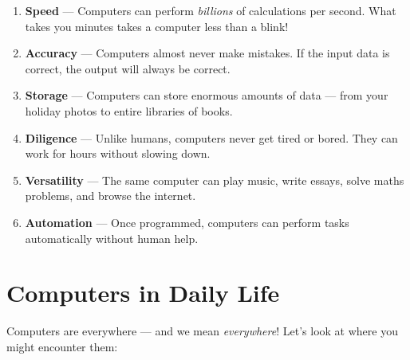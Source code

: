 \begin{enumerate}[label=\textcolor{ModuleBlue}{\textbf{\arabic*.}}, itemsep=6pt]
  \item \textbf{Speed} --- Computers can perform \emph{billions} of calculations per second. What takes you minutes takes a computer less than a blink!
  \item \textbf{Accuracy} --- Computers almost never make mistakes. If the input data is correct, the output will always be correct.
  \item \textbf{Storage} --- Computers can store enormous amounts of data --- from your holiday photos to entire libraries of books.
  \item \textbf{Diligence} --- Unlike humans, computers never get tired or bored. They can work for hours without slowing down.
  \item \textbf{Versatility} --- The same computer can play music, write essays, solve maths problems, and browse the internet.
  \item \textbf{Automation} --- Once programmed, computers can perform tasks automatically without human help.
\end{enumerate}


\section{Computers in Daily Life}
\label{sec:daily-life}

Computers are everywhere --- and we mean \emph{everywhere}! Let's look at where you might encounter them:

